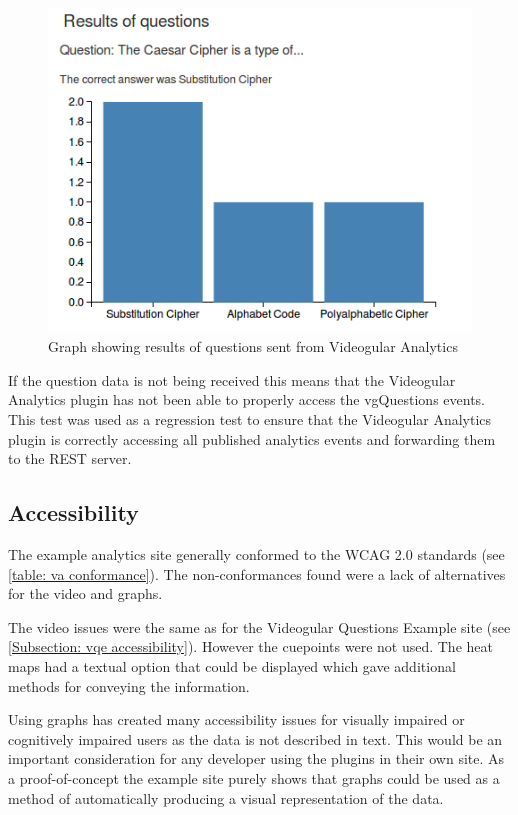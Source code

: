 \begin{figure}[h]
	\centering
		\includegraphics[scale=0.8]{../figures/analytics_graphs.png}
	\caption{\label{Figure:Analytics Question Graphs} Graph showing results of questions sent from Videogular Analytics}
\end{figure}

If the question data is not being received this means that the \gls{Videogular} Analytics plugin has not been able to properly access the \gls{vgQuestions} events. This test was used as a regression test to ensure that the Videogular Analytics plugin is correctly accessing all published analytics events and forwarding them to the \gls{REST} server.

\subsection{Accessibility}

The example analytics site generally conformed to the \gls{WCAG} 2.0 standards (see \autoref{table: va conformance}). The non-conformances found were a lack of alternatives for the video and graphs.

The video issues were the same as for the Videogular Questions Example site (see \autoref{Subsection: vqe accessibility}). However the cuepoints were not used. The heat maps had a textual option that could be displayed which gave additional methods for conveying the information.

Using graphs has created many accessibility issues for visually impaired or cognitively impaired users as the data is not described in text. This would be an important consideration for any developer using the plugins in their own site. As a proof-of-concept the example site purely shows that graphs could be used as a method of automatically producing a visual representation of the data.

